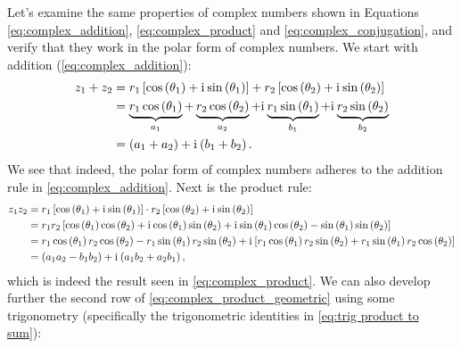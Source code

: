 Let's examine the same properties of complex numbers shown in Equations \ref{eq:complex_addition}, \ref{eq:complex_product} and \ref{eq:complex_conjugation}, and verify that they work in the polar form of complex numbers. We start with addition (\autoref{eq:complex_addition}):
\begin{align}
	z_{1}+z_{2} &= r_{1}\left[ \cos\left( \theta_{1} \right) + \mathrm{i}\mkern1mu\sin\left( \theta_{1} \right) \right] + r_{2}\left[ \cos\left( \theta_{2} \right) + \mathrm{i}\mkern1mu\sin\left( \theta_{2} \right) \right]\nonumber\\
	&= \underbrace{r_{1}\cos\left( \theta_{1} \right)}_{a_{1}} + \underbrace{r_{2}\cos\left( \theta_{2} \right)}_{a_{2}} + \mathrm{i}\mkern1mu\underbrace{r_{1}\sin\left( \theta_{1} \right)}_{b_{1}} + \mathrm{i}\mkern1mu\underbrace{r_{2}\sin\left( \theta_{2} \right)}_{b_{2}}\nonumber\\
&= \left( a_{1}+a_{2} \right) + \mathrm{i}\mkern1mu\left( b_{1}+b_{2} \right).
	\label{eq:complex_addition_geometric}
\end{align}
We see that indeed, the polar form of complex numbers adheres to the addition rule in \autoref{eq:complex_addition}. Next is the product rule:
\begin{align}
	z_{1}z_{2} &= r_{1}\left[ \cos\left(\theta_{1}\right) + \mathrm{i}\mkern1mu\sin\left(\theta_{1}\right) \right] \cdot r_{2}\left[ \cos\left(\theta_{2}\right) + \mathrm{i}\mkern1mu\sin\left(\theta_{2}\right) \right]\nonumber\\
	&= r_{1}r_{2}\left[ \cos\left( \theta_{1} \right)\cos\left( \theta_{2} \right) + \mathrm{i}\mkern1mu\cos\left( \theta_{1} \right)\sin\left( \theta_{2} \right) + \mathrm{i}\mkern1mu\sin\left( \theta_{1} \right)\cos\left( \theta_{2} \right) -\sin\left( \theta_{1} \right)\sin\left( \theta_{2} \right)  \right]\nonumber\\
	&= r_{1}\cos\left( \theta_{1} \right)r_{2}\cos\left( \theta_{2} \right) - r_{1}\sin\left( \theta_{1} \right)r_{2}\sin\left( \theta_{2} \right) + \mathrm{i}\mkern1mu\left[ r_{1}\cos\left( \theta_{1} \right)r_{2}\sin\left( \theta_{2} \right) + r_{1}\sin\left( \theta_{1} \right)r_{2}\cos\left( \theta_{2} \right) \right]\nonumber\\
	&= \left( a_{1}a_{2}-b_{1}b_{2} \right) + \mathrm{i}\mkern1mu\left( a_{1}b_{2} + a_{2}b_{1} \right),
	\label{eq:complex_product_geometric}
\end{align}
which is indeed the result seen in \autoref{eq:complex_product}. We can also develop further the second row of \autoref{eq:complex_product_geometric} using some trigonometry (specifically the trigonometric identities in \autoref{eq:trig product to sum}):
